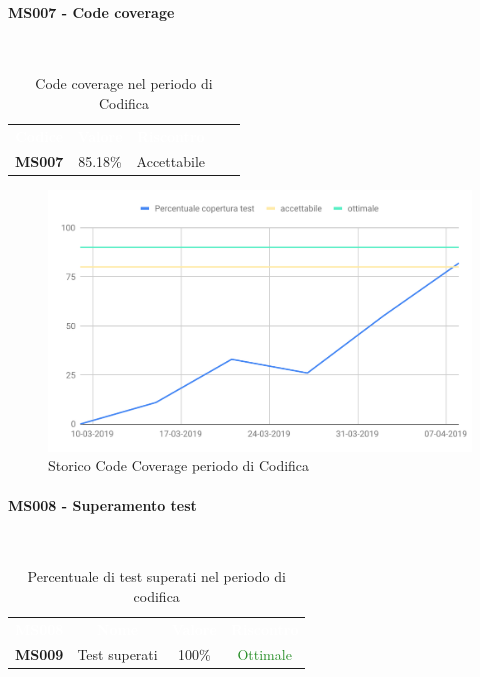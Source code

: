 \paragraph{MS007 - Code coverage}\mbox{}\\[0,3cm]
    \begin{table}[H]
        \centering
        \begin{tabular}{ccccc}
            \rowcolor{greySWEight}
            \textcolor{white}{\textbf{Codice}} &
            \textcolor{white}{\textbf{Valore}}&
            \textcolor{white}{\textbf{Riscontro}}\\
            \textbf{MS007} & 85.18\% & \textcolor{YellowOrange}{Accettabile}\\
        \end{tabular}
        \caption{Code coverage nel periodo di Codifica}
    \end{table}
    \begin{figure}[H]
        \centering
        \includegraphics[width=0.7\linewidth]{sez/App_Esito/Qualifica/graph/storicoCodeCoverage.pdf}
        \caption{Storico Code Coverage periodo di Codifica}
    \end{figure}

\paragraph{MS008 - Superamento test}\mbox{}\\[0,3cm]
    \begin{table}[H]
        \centering
        \begin{tabular}{cccc}
        \rowcolor{greySWEight}
        \textcolor{white}{\textbf{MS008}} &
        \textcolor{white}{\textbf{Nome}} &
        \textcolor{white}{\textbf{Valore}} &
        \textcolor{white}{\textbf{Riscontro}}\\
        \textbf{MS009}& Test superati & 100\% & \textcolor{ForestGreen}{Ottimale} \\

        \end{tabular}
        \caption{Percentuale di test superati nel periodo di codifica}
    \end{table}

